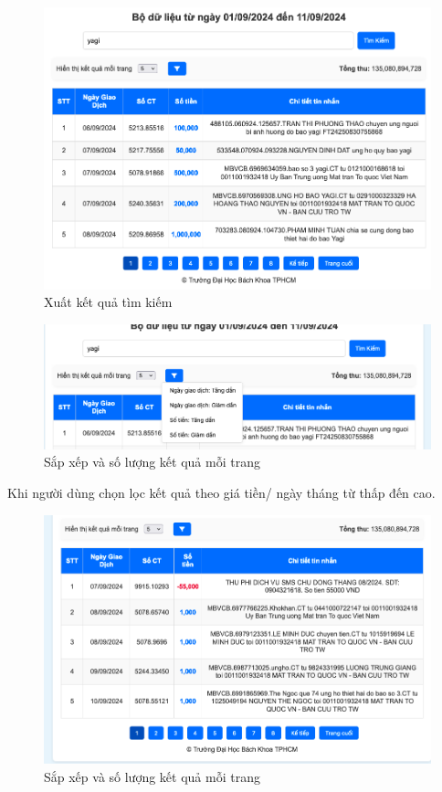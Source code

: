 \begin{figure}[!ht]
\includegraphics[width=15cm]{Images/img/searching.png}
\caption{Xuất kết quả tìm kiếm}
\end{figure}


\begin{figure}[!ht]
\includegraphics[width=15cm]{Images/img/filter_and_show_result_per_page.png}
\caption{Sắp xếp và số lượng kết quả mỗi trang}
\end{figure}
\newpage
Khi người dùng chọn lọc kết quả theo giá tiền/ ngày tháng từ thấp đến cao.
\begin{figure}[!ht]
\includegraphics[width=15cm]{Images/img/order_lowest_to_hhighest_credit.png}
\caption{Sắp xếp và số lượng kết quả mỗi trang}
\end{figure}
